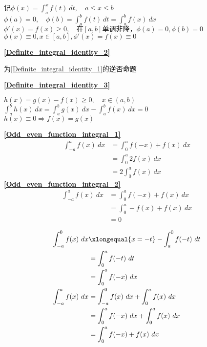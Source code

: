 \begin{center}
	\mbox{记}$\phi (x)=\int_{a}^{x}f(t)\ dt,\quad a\leqslant x\leqslant b$\\
	$\phi(a)= 0,\quad \phi(b)=\int_{a}^{b}f(t)\ dt=\int_{a}^{b}f(x)\ dx$\\
	$\phi'(x)=f(x)\geqslant 0,\quad \mbox{在}\left[a,b\right]\mbox{单调非降}，\phi(a)=0,\phi(b)=0$\\
	$\phi(x)\equiv 0,x\in\left[a,b\right],\phi'(x)=f(x)\equiv 0$
\end{center}
\textbf{\large \ref{Definite_integral_identity_2}}
\begin{center}
	为\ref{Definite_integral_identity_1}的逆否命题
\end{center} 
\textbf{\large \ref{Definite_integral_identity_3}}
\begin{center}
	$h(x)=g(x)-f(x)\geqslant 0,\quad x\in(a,b)$\\
	$\int_{a}^{b}h(x)\ dx=\int_{a}^{b}g(x)\ dx-\int_{a}^{b}f(x)\ dx=0$\\
	$h(x)\equiv 0\Rightarrow f(x)=g(x)$
\end{center}
\begin{minipage}{.5\textwidth}
	\textbf{\large \ref{Odd_even_function_integral_1}}\\
	\begin{align*}
	\int_{-a}^{a}f(x)\ dx&=\int_{0}^{a}f(-x)+f(x)\ dx\\
	&=\int_{0}^{a}2f(x)\ dx\\
	&=2\int_{0}^{a}f(x)\ dx
	\end{align*}
	\textbf{\large \ref{Odd_even_function_integral_2}}\\
	\begin{align*}
		\int_{-a}^{a}f(x)\ dx&=\int_{0}^{a}f(-x)+f(x)\ dx\\
		&=\int_{0}^{a}-f(x)+f(x)\ dx\\
		&=0
	\end{align*}
\end{minipage}
\hfill
\vline
\begin{minipage}{.5\textwidth}
	\begin{align*}
		\int_{-a}^{0}f(x)\ dx&\xlongequal{x=-t}-\int_{a}^{0}f(-t)\ dt\\
		&=\int_{0}^{a}f(-t)\ dt\\
		&=\int_{0}^{a}f(-x)\ dx\\
\int_{-a}^{a}f(x)\ dx&=\int_{-a}^{0}f(x)\ dx+\int_{0}^{a}f(x)\ dx\\
&=\int_{0}^{a}f(-x)\ dx+\int_{0}^{a}f(x)\ dx\\
&=\int_{0}^{a}f(-x)+f(x)\ dx
	\end{align*}
\end{minipage}
